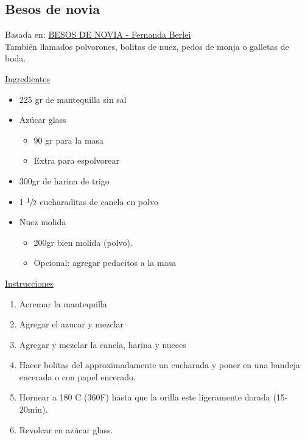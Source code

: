 \subsection{Besos de novia}

Basada en: \href{https://www.youtube.com/watch?v=V18ECzDqUjM}{BESOS DE NOVIA - Fernanda Berlei
} \\

También llamados polvorones, bolitas de nuez, pedos de monja o galletas de boda.

\underline{Ingredientes}

\begin{itemize}
\item 225 gr de mantequilla sin sal
\item Azúcar glass
\begin{itemize}
\item 90 gr para la masa
\item Extra para espolvorear
\end{itemize}
\item 300gr de harina de trigo
\item 1 $\sfrac{1}{2}$ cucharaditas de canela en polvo
\item Nuez molida
\begin{itemize}
\item 200gr bien molida (polvo).
\item Opcional: agregar pedacitos a la masa
\end{itemize}
\end{itemize}


\underline{Instrucciones}

\begin{enumerate}
\item Acremar la mantequilla
\item Agregar el azucar y mezclar
\item Agregar y mezclar la canela, harina y nueces
\item Hacer bolitas del approximadamente un cucharada y poner en una bandeja encerada o con papel encerado.
\item Hornear a 180 C (360F) hasta que la orilla este ligeramente dorada (15-20min).
\item Revolcar en azúcar glass.
\end{enumerate}

